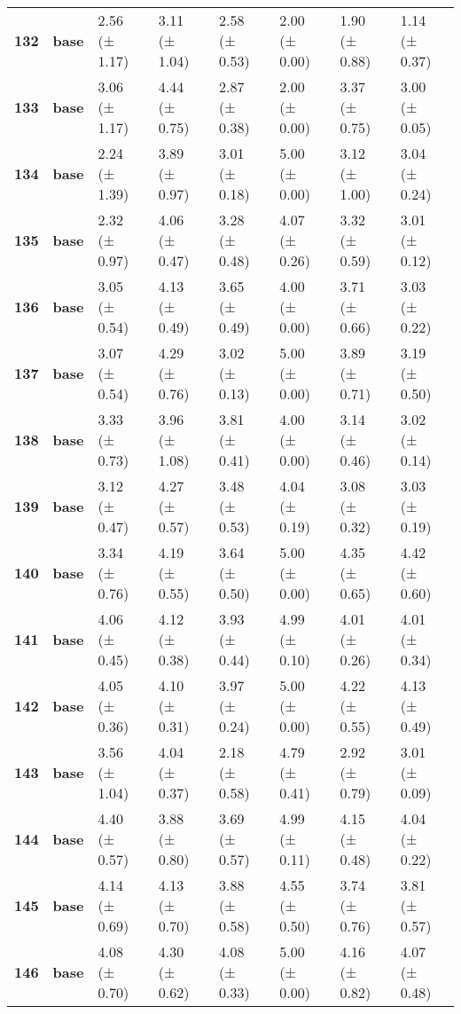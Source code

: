 \begin{longtable}{llllllll}
\cline{1-8}
\textbf{132} & \textbf{base} & 2.56 (± 1.17) & 3.11 (± 1.04) & 2.58 (± 0.53) & 2.00 (± 0.00) & 1.90 (± 0.88) & 1.14 (± 0.37) \\
\cline{1-8}
\textbf{133} & \textbf{base} & 3.06 (± 1.17) & 4.44 (± 0.75) & 2.87 (± 0.38) & 2.00 (± 0.00) & 3.37 (± 0.75) & 3.00 (± 0.05) \\
\cline{1-8}
\textbf{134} & \textbf{base} & 2.24 (± 1.39) & 3.89 (± 0.97) & 3.01 (± 0.18) & 5.00 (± 0.00) & 3.12 (± 1.00) & 3.04 (± 0.24) \\
\cline{1-8}
\textbf{135} & \textbf{base} & 2.32 (± 0.97) & 4.06 (± 0.47) & 3.28 (± 0.48) & 4.07 (± 0.26) & 3.32 (± 0.59) & 3.01 (± 0.12) \\
\cline{1-8}
\textbf{136} & \textbf{base} & 3.05 (± 0.54) & 4.13 (± 0.49) & 3.65 (± 0.49) & 4.00 (± 0.00) & 3.71 (± 0.66) & 3.03 (± 0.22) \\
\cline{1-8}
\textbf{137} & \textbf{base} & 3.07 (± 0.54) & 4.29 (± 0.76) & 3.02 (± 0.13) & 5.00 (± 0.00) & 3.89 (± 0.71) & 3.19 (± 0.50) \\
\cline{1-8}
\textbf{138} & \textbf{base} & 3.33 (± 0.73) & 3.96 (± 1.08) & 3.81 (± 0.41) & 4.00 (± 0.00) & 3.14 (± 0.46) & 3.02 (± 0.14) \\
\cline{1-8}
\textbf{139} & \textbf{base} & 3.12 (± 0.47) & 4.27 (± 0.57) & 3.48 (± 0.53) & 4.04 (± 0.19) & 3.08 (± 0.32) & 3.03 (± 0.19) \\
\cline{1-8}
\textbf{140} & \textbf{base} & 3.34 (± 0.76) & 4.19 (± 0.55) & 3.64 (± 0.50) & 5.00 (± 0.00) & 4.35 (± 0.65) & 4.42 (± 0.60) \\
\cline{1-8}
\textbf{141} & \textbf{base} & 4.06 (± 0.45) & 4.12 (± 0.38) & 3.93 (± 0.44) & 4.99 (± 0.10) & 4.01 (± 0.26) & 4.01 (± 0.34) \\
\cline{1-8}
\textbf{142} & \textbf{base} & 4.05 (± 0.36) & 4.10 (± 0.31) & 3.97 (± 0.24) & 5.00 (± 0.00) & 4.22 (± 0.55) & 4.13 (± 0.49) \\
\cline{1-8}
\textbf{143} & \textbf{base} & 3.56 (± 1.04) & 4.04 (± 0.37) & 2.18 (± 0.58) & 4.79 (± 0.41) & 2.92 (± 0.79) & 3.01 (± 0.09) \\
\cline{1-8}
\textbf{144} & \textbf{base} & 4.40 (± 0.57) & 3.88 (± 0.80) & 3.69 (± 0.57) & 4.99 (± 0.11) & 4.15 (± 0.48) & 4.04 (± 0.22) \\
\cline{1-8}
\textbf{145} & \textbf{base} & 4.14 (± 0.69) & 4.13 (± 0.70) & 3.88 (± 0.58) & 4.55 (± 0.50) & 3.74 (± 0.76) & 3.81 (± 0.57) \\
\cline{1-8}
\textbf{146} & \textbf{base} & 4.08 (± 0.70) & 4.30 (± 0.62) & 4.08 (± 0.33) & 5.00 (± 0.00) & 4.16 (± 0.82) & 4.07 (± 0.48) \\

\end{longtable}
